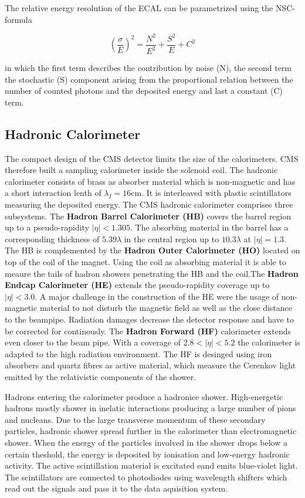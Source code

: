 The relative energy resolution of the ECAL can be parametrized using the NSC-formula

\begin{equation}
    \left( \frac{\sigma}{E} \right)^2 = \frac{N^2}{E^2} + \frac{S^2}{E} + C^2
\end{equation}

in which the first term describes the contribution by noise (N), the second
term the stochastic (S) component arising from the proportional relation between
the number of counted photons and the deposited energy and last a constant (C)
term.

\subsection{Hadronic Calorimeter}

The compact design of the CMS detector limits the size of the calorimeters. CMS
therefore built a sampling calorimeter inside the solenoid coil. The hadronic
calorimeter consists of brass as absorber material which is non-magnetic and
has a short interaction lenth of $\lambda_I = 16 \si{\centi\metre}$. It is
interleaved with plastic scintillators measuring the deposited energy. The CMS
hadronic calorimeter comprises three subsystems. The \textbf{Hadron Barrel
Calorimeter (HB)} covers the barrel region up to a pseudo-rapidity $|\eta| <
1.305$. The absorbing material in the barrel has a corresponding thickness of
$5.39 \lambda$ in the central region up to $10.3 \lambda$ at $|\eta| = 1.3$. The
HB is complemented by the \textbf{Hadron Outer Calorimeter (HO)} located on top
of the coil of the magnet. Using the coil as absorbing material it is able to
meaure the tails of hadron showers penetrating the HB and the coil.The
\textbf{Hadron Endcap Calorimeter (HE)} extends the pseudo-rapidity coverage up
to $|\eta| < 3.0$. A major challenge in the construction of the HE were the
usage of non-magnetic material to not disturb the magnetic field as well as the
close distance to the beampipe. Radiation damages decrease the detector response
and have to be corrected for continously. The \textbf{Hadron Forward (HF)}
calorimeter extends even closer to the beam pipe. With a coverage of $2.8 <
|\eta| < 5.2$ the calorimeter is adapted to the high radiation environment. The
HF is desinged using iron absorbers and quartz fibres as active material, which
measure the Cerenkov light emitted by the relativistic components of the
shower.

Hadrons entering the calorimeter produce a hadronice shower. High-energetic
hadrons mostly shower in inelatic interactions producing a large number of pions
and nucleans. Due to the large transverse momentum of these secondary particles,
hadronic shower spread further in the calorimeter than electromagnetic shower.
When the energy of the particles involved in the shower drops below a certain
theshold, the energy is deposited by ionisation and low-energy hadronic
activity. The active scintillation material is excitated eand emits blue-violet
light. The scintillators are connected to photodiodes using wavelength
shifters which read out the signals and pass it to the data aquisition system.

